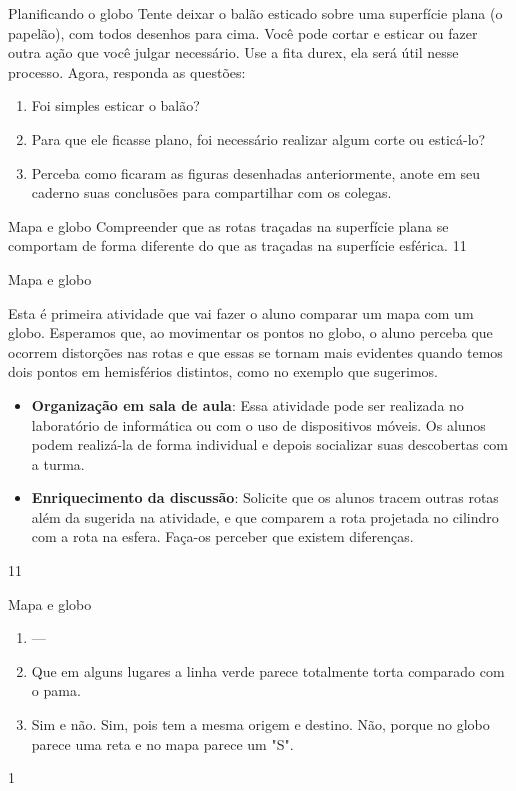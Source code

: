\begin{task}{Planificando o globo}
Tente deixar o balão esticado sobre uma superfície plana (o papelão), com todos desenhos para cima. Você pode cortar e esticar ou fazer outra ação que você julgar necessário. Use a  fita durex, ela será  útil nesse processo.
Agora, responda as questões:
\begin{enumerate}
\item Foi simples esticar o balão?
\item Para que ele ficasse plano, foi necessário realizar algum corte ou esticá-lo?
\item Perceba como ficaram as figuras desenhadas anteriormente, anote em seu caderno suas conclusões para compartilhar com os colegas.
\end{enumerate}

\end{task}

\clearpage

\begin{ObjetivoEsp}{Mapa e globo}
{
  Compreender que as rotas traçadas na superfície plana se comportam de forma diferente do que as traçadas na superfície esférica.
}{1}{1}
\end{ObjetivoEsp}

\begin{Recomenda}{Mapa e globo}
{
  Esta é primeira atividade que vai fazer o aluno comparar um mapa com um globo. Esperamos que, ao movimentar os pontos no globo, o aluno perceba que ocorrem distorções nas rotas e que essas se tornam mais evidentes quando temos dois pontos em hemisférios distintos, como no exemplo que sugerimos.

  \begin{itemize}
  \item \textbf{Organização em sala de aula}: Essa atividade pode ser realizada no laboratório de informática ou com o uso de dispositivos móveis. Os alunos podem realizá-la de forma individual e depois socializar suas descobertas com a turma.
  \item \textbf{Enriquecimento da discussão}: Solicite que os alunos tracem outras rotas além da sugerida na atividade, e que comparem a rota projetada no cilindro com a rota na esfera. Faça-os perceber que existem diferenças.
  \end{itemize}
}{1}{1}
\end{Recomenda}
\begin{resposta}{Mapa e globo}
{
  \begin{enumerate}
  \item ---
  \item Que em alguns lugares a linha verde parece totalmente torta comparado com o pama.
  \item Sim e não. Sim, pois tem a mesma origem e destino. Não, porque no globo parece uma reta e no mapa parece um "S".
  \end{enumerate}
}{1}
\end{resposta}

